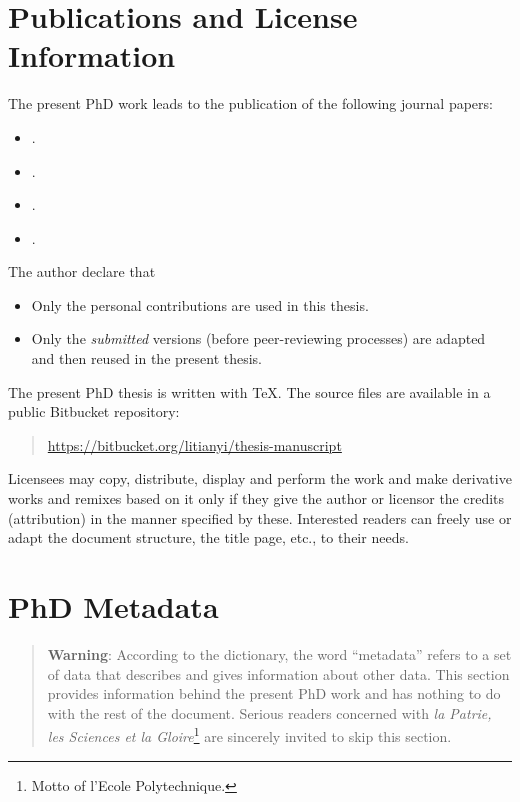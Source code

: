 \section*{Publications and License Information}
The present PhD work leads to the publication of the following journal papers:
\begin{itemize}
\item {}. 
\item {}. 
\item {}. 
\item {}. 
\end{itemize}

The author declare that
\begin{itemize}
\item Only the personal contributions are used in this thesis.
\item Only the \emph{submitted} versions (before peer-reviewing processes) are adapted and then reused in the present thesis.
\end{itemize}

The present PhD thesis is written with \TeX. The source files are available in a public Bitbucket repository:
\begin{quotation}
\url{https://bitbucket.org/litianyi/thesis-manuscript}
\end{quotation}

\doclicenseThis

Licensees may copy, distribute, display and perform the work and make derivative works and remixes based on it only if they give the author or licensor the credits (attribution) in the manner specified by these. Interested readers can freely use or adapt the document structure, the title page, etc., to their needs.

\section*{PhD Metadata}
\begin{quotation}
\textbf{Warning}: According to the dictionary, the word ``metadata'' refers to a set of data that describes and gives information about other data. This section provides information behind the present PhD work and has nothing to do with the rest of the document. Serious readers concerned with \emph{la Patrie, les Sciences et la Gloire}\footnote{Motto of l'Ecole Polytechnique.} are sincerely invited to skip this section.
\end{quotation}

